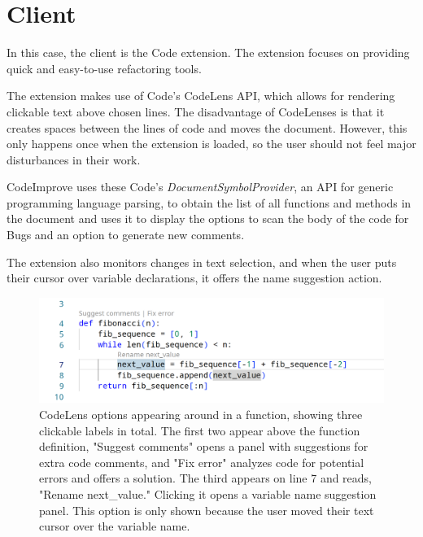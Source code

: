     \section{Client}
        In this case, the client is the Code extension. The extension focuses on providing quick and easy-to-use refactoring tools. 
        
        The extension makes use of Code's CodeLens API, which allows for rendering clickable text above chosen lines. The disadvantage of CodeLenses is that it creates spaces between the lines of code and moves the document. However, this only happens once when the extension is loaded, so the user should not feel major disturbances in their work.
        
        \medskip 
        
        CodeImprove uses these Code's \emph{DocumentSymbolProvider}, an API for generic programming language parsing, to obtain the list of all functions and methods in the document and uses it to display the options to scan the body of the code for Bugs and an option to generate new comments. 
        
        The extension also monitors changes in text selection, and when the user puts their cursor over variable declarations, it offers the name suggestion action.
        
        \begin{figure}[ht!]
          \centering
          \includegraphics[width=\textwidth]{obrazky-figures/vscode-function.png}
          \caption{CodeLens options appearing around in a function, showing three clickable labels in total. The first two appear above the function definition, "Suggest comments" opens a panel with suggestions for extra code comments, and "Fix error" analyzes code for potential errors and offers a solution. The third appears on line 7 and reads, "Rename next\_value." Clicking it opens a variable name suggestion panel. This option is only shown because the user moved their text cursor over the variable name.}
          \label{fig:vscode_function}
        \end{figure}
        
